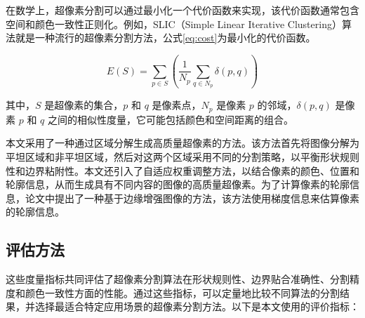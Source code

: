 在数学上，超像素分割可以通过最小化一个代价函数来实现，该代价函数通常包含空间和颜色一致性正则化。例如，SLIC（Simple Linear Iterative Clustering）算法就是一种流行的超像素分割方法，公式\eqref{eq:cost}为最小化的代价函数。

\begin{equation}
  E(S) = \sum_{p \in S} \left( \frac{1}{N_p} \sum_{q \in N_p} \delta(p, q) \right)
  \label{eq:cost}
\end{equation}

其中，\(S\) 是超像素的集合，\(p\) 和 \(q\) 是像素点，\(N_p\) 是像素 \(p\) 的邻域，\(\delta(p, q)\) 是像素 \(p\) 和 \(q\) 之间的相似性度量，它可能包括颜色和空间距离的组合。

本文采用了一种通过区域分解生成高质量超像素的方法。该方法首先将图像分解为平坦区域和非平坦区域，然后对这两个区域采用不同的分割策略，以平衡形状规则性和边界粘附性。本文还引入了自适应权重调整方法，以结合像素的颜色、位置和轮廓信息，从而生成具有不同内容的图像的高质量超像素。为了计算像素的轮廓信息，论文中提出了一种基于边缘增强图像的方法，该方法使用梯度信息来估算像素的轮廓信息。


\subsection{评估方法}
这些度量指标共同评估了超像素分割算法在形状规则性、边界贴合准确性、分割精度和颜色一致性方面的性能。通过这些指标，可以定量地比较不同算法的分割结果，并选择最适合特定应用场景的超像素分割方法。以下是本文使用的评价指标：

